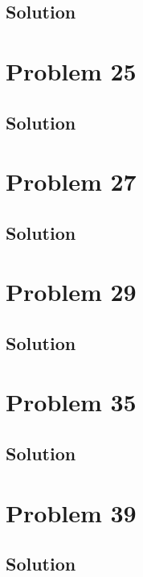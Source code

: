 \documentclass[12pt]{article}
\begin{document}
        \subsection{Solution}

    \pagebreak
    \section{Problem 25}

        \subsection{Solution}

    \pagebreak
    \section{Problem 27}

        \subsection{Solution}

    \pagebreak
    \section{Problem 29}

        \subsection{Solution}

    \pagebreak
    \section{Problem 35}

        \subsection{Solution}

    \pagebreak
    \section{Problem 39}

        \subsection{Solution}

    \pagebreak
\end{document}
